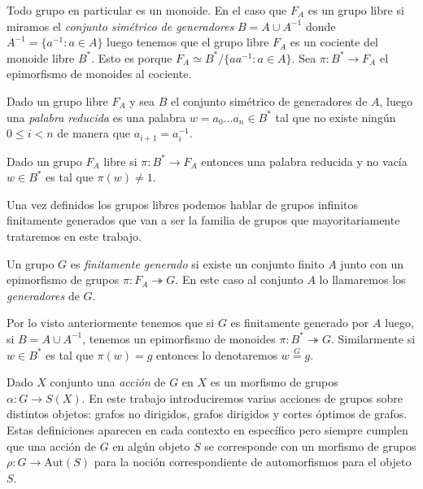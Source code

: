 \documentclass[tesis.tex]{subfiles}
\begin{document}
Todo grupo en particular es un monoide.
En el caso que $F_{A}$ es un grupo libre si miramos el \emph{conjunto simétrico de generadores} $B = A \cup A^{-1}$ donde $A^{-1} = \{ a^{-1} : a \in A \}$ luego tenemos que el grupo libre $F_{A}$ es un cociente del monoide libre $B^*$.
Esto es porque $F_{A} \simeq B^{*} / \{ aa^{-1} : a \in A \}$.
Sea $\pi: B^{*} \to F_{A}$ el epimorfismo de monoides al cociente.


\begin{deff}
	Dado un grupo libre $F_{A}$ y sea $B$ el conjunto simétrico de generadores de $A$, luego una \emph{palabra reducida} es una palabra $w = a_{0} \dots a_{n} \in B^{*}$ tal que no existe ningún $0 \le i < n$ de manera que $a_{i+1}=a_{i}^{-1}$.
\end{deff}


\begin{obs}\label{obs_libres_pal_red}
	Dado un grupo $F_{A}$ libre si $\pi:B^* \to F_{A}$ entonces una palabra reducida y no vacía $w \in B^*$  es tal que $\pi(w) \neq 1$.
\end{obs}

Una vez definidos los grupos libres podemos hablar de grupos infinitos finitamente generados que van a ser la familia de grupos que mayoritariamente trataremos en este trabajo.


\begin{deff}
	Un grupo $G$ es \emph{finitamente generado} si existe un conjunto finito $A$ junto con un epimorfismo de grupos $\pi: F_{A} \twoheadrightarrow G$.
	En este caso al conjunto $A$ lo llamaremos los \emph{generadores} de $G$.
\end{deff}

Por lo visto anteriormente tenemos que si $G$ es finitamente generado por $A$ luego, si $B = A \cup A^{-1}$, 
tenemos un epimorfismo de monoides $\pi:B^* \twoheadrightarrow G$.
Similarmente si $w \in B^*$ es tal que $\pi(w) = g$ entonces lo denotaremos $w \overset{G}{=} g$.

\medskip



Dado $X$ conjunto una \emph{acción} de $G$ en $X$ es un morfismo de grupos $\alpha: G \to S(X)$.
En este trabajo introduciremos varias acciones de grupos sobre distintos objetos: grafos no dirigidos, grafos dirigidos y cortes óptimos de grafos. 
Estas definiciones aparecen en cada contexto en específico pero siempre cumplen que una acción de $G$ en algún objeto $S$ se corresponde con un morfismo de grupos $\rho:G \to \text{Aut}(S)$ para la noción correspondiente de automorfismos para el objeto $S$.
\end{document}
